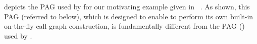 


 depicts the PAG  used by \LFCR for our motivating example given in ~. As shown, this PAG
(referred to below), which is designed to enable \LFCR to perform
its own built-in on-the-fly call graph construction,
is fundamentally different from the PAG () used by \manuLFC.




\begin{comment}
For all heap objects, \texttt{A}, \texttt{B}, \texttt{O1}, \texttt{O2} and \texttt{D}, 
a \new edge is added with their respective types being recorded. For static calls, arguments are connected with their corresponding parameters:
$\texttt{a} \xrightarrow[\check{\texttt{c1}}]{\assign} \texttt{x}$,
$\texttt{b} \xrightarrow[\check{\texttt{c2}}]{\assign} \texttt{x}$,
$\texttt{o1} \xrightarrow[\check{\texttt{c1}}]{\assign} \texttt{o}$, and
$\texttt{o2} \xrightarrow[\check{\texttt{c2}}]{\assign} \texttt{o}$.
For the instance calls, all arguments are connected with their corresponding receivers:
$\texttt{x}\xrightarrow[\hat{\boxed{\texttt{c3}}}]{\assign}\texttt{x}$,
$\texttt{d}\xrightarrow[\hat{\boxed{\texttt{c3}}}]{\store[1]}\texttt{x}$, and receivers are connected with their representations at the callsites: 
$\texttt{x} \xrightarrow[\check{\boxed{\mathtt{c3}}}]{\assign} \mathtt{x\#c3}$.
Correspondingly, 
parameters are loaded inside their methods:
$\texttt{this}^\texttt{A:foo()} \xrightarrow{\load[1]}p$,
$\texttt{this}^\texttt{B:foo()}\xrightarrow{\load[1]}q$,
and
$\texttt{this}^\texttt{C:foo()}\xrightarrow{\load[1]}r$. Finally, dispatch edges are added
between representation of receivers and ``this'' parameter according to different dispatching targets:
$\texttt{x\#c3}\xrightarrow[\hat{\texttt{c3}}]{\indispatch[\mathtt{A}]}\texttt{this}^\texttt{A:foo()}$,
$\texttt{x\#c3}\xrightarrow[ \hat{\texttt{c3}}]{\indispatch[\mathtt{B}]}\texttt{this}^\texttt{B:foo()}$ and
$\texttt{x\#c3}\xrightarrow[\hat{\texttt{c3}}]{\indispatch[\mathtt{C}]}\texttt{this}^\texttt{C:foo()}$.
($\texttt{x\#c3}\xrightarrow[\hat{\texttt{c3}}]{\indispatch[\mathtt{C}]}\texttt{this}^\texttt{C:foo()}$ 
would not be established if PAG is built relying on a context-insensitive pointer analysis.)
\end{comment}


